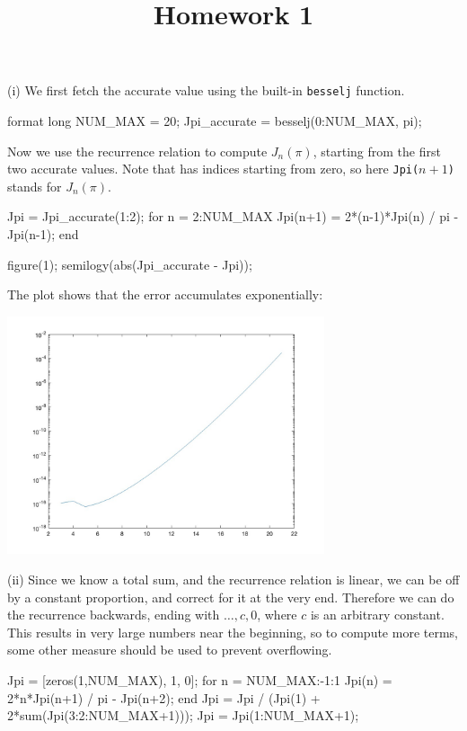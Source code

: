 \documentclass{homework}
\title{Homework 1}
\begin{document}
\maketitle

\begin{problem}
(i) We first fetch the accurate value using the
built-in \texttt{besselj} function.
\begin{matlab}
format long
NUM_MAX = 20;
Jpi_accurate = besselj(0:NUM_MAX, pi);
\end{matlab}
Now we use the recurrence relation to compute
\(J_n(\pi)\), starting from the first two
accurate values. Note that \Matlab{} has indices
starting from zero, so here \texttt{Jpi(\(n+1\))}
stands for \(J_{n}(\pi)\).
\begin{matlab}
Jpi = Jpi_accurate(1:2);
for n = 2:NUM_MAX
    Jpi(n+1) = 2*(n-1)*Jpi(n) / pi - Jpi(n-1);
end

figure(1);
semilogy(abs(Jpi_accurate - Jpi));
\end{matlab}
The plot shows that the error accumulates
exponentially:
\begin{center}
\includegraphics[width=0.7\textwidth]{Hw1-Fig1.jpg}
\end{center}

(ii) Since we know a total sum, and the
recurrence relation is linear, we can be off by
a constant proportion, and correct for it at the
very end. Therefore we can do the recurrence
backwards, ending with \(\dots,c,0\), where \(c\)
is an arbitrary constant. This results in very
large numbers near the beginning, so to compute
more terms, some other measure should be used to
prevent overflowing.
\begin{matlab}
Jpi = [zeros(1,NUM_MAX), 1, 0];
for n = NUM_MAX:-1:1
    Jpi(n) = 2*n*Jpi(n+1) / pi - Jpi(n+2);
end
Jpi = Jpi / (Jpi(1) + 2*sum(Jpi(3:2:NUM_MAX+1)));
Jpi = Jpi(1:NUM_MAX+1);  %


\end{matlab}
\end{problem}
\end{document}
